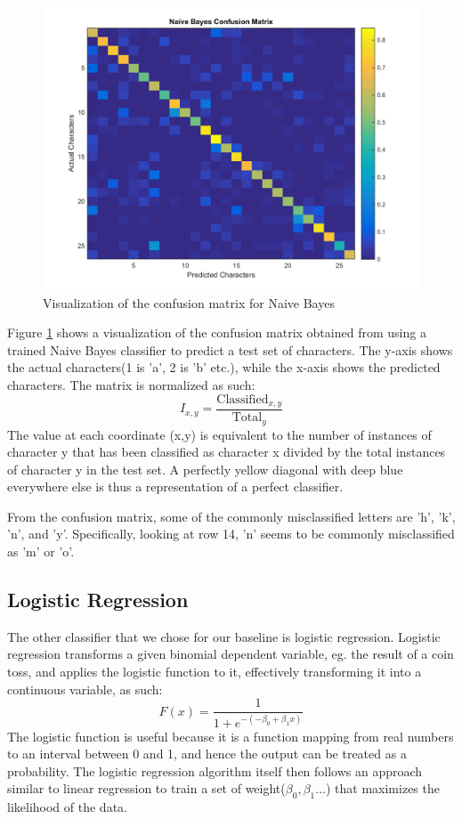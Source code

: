 \documentclass{article} %
\begin{document}
\begin{figure}[h]
\begin{center}
\includegraphics[scale=0.3]{confusion_nb.png}
\end{center}
\caption{Visualization of the confusion matrix for Naive Bayes}
\label{fig:nb-conf-mat}
\end{figure}

Figure \ref{fig:nb-conf-mat} shows a visualization of the confusion matrix obtained from using a trained Naive Bayes classifier to predict a test set of characters. The y-axis shows the actual characters(1 is 'a', 2 is 'b' etc.), while the x-axis shows the predicted characters. The matrix is normalized as such:
$$I_{x, y} = \frac{\mbox{Classified}_{x, y}}{\mbox{Total}_{y}}$$
The value at each coordinate (x,y) is equivalent to the number of instances of character y that has been classified as character x divided by the total instances of character y in the test set. A perfectly yellow diagonal with deep blue everywhere else is thus a representation of a perfect classifier.

From the confusion matrix, some of the commonly misclassified letters are 'h', 'k', 'n', and 'y'. Specifically, looking at row 14, 'n' seems to be commonly misclassified as 'm' or 'o'. 

\subsection{Logistic Regression}
The other classifier that we chose for our baseline is logistic regression.
Logistic regression transforms a given binomial dependent variable, eg. the result of a coin toss, and applies the logistic function to it, effectively transforming it into a continuous variable, as such:
$$F(x) = \frac{1}{1+e^{-(-\beta_0 + \beta_1x)}}$$
The logistic function is useful because it is a function mapping from real numbers to an interval between 0 and 1, and hence the output can be treated as a probability. The logistic regression algorithm itself then follows an approach similar to linear regression to train a set of weight($\beta_0, \beta_1...$) that maximizes the likelihood of the data.
\end{document}
